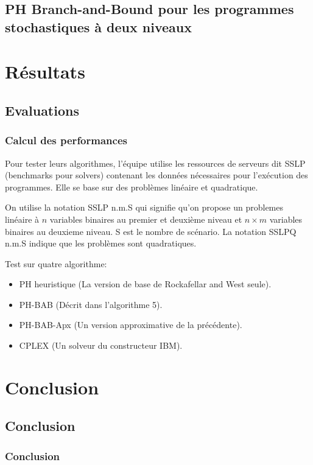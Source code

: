 \documentclass[10pt]{beamer}
\begin{document}
    \subsection{PH Branch-and-Bound pour les programmes stochastiques à deux niveaux}
    
    \section{Résultats}
    \subsection{Evaluations}
    \begin{frame}
        \frametitle{Calcul des performances}
        Pour tester leurs algorithmes, l'équipe utilise les ressources de serveurs dit SSLP (benchmarks pour solvers) contenant les données nécessaires pour l'exécution des programmes. Elle se base sur des problèmes linéaire et quadratique.
        
        On utilise la notation SSLP n.m.S qui signifie qu'on propose un problemes linéaire à $n$ variables binaires au premier et deuxième niveau et $n \times m$ variables binaires au deuxieme niveau. S est le nombre de scénario.
        La notation SSLPQ n.m.S indique que les problèmes sont quadratiques.
    \end{frame}
    
    \begin{frame}
        Test sur quatre algorithme:\\
        \begin{itemize}
            \item PH heuristique (La version de base de Rockafellar and West seule).
            \item PH-BAB (Décrit dans l'algorithme 5).
            \item PH-BAB-Apx (Un version approximative de la précédente).
            \item CPLEX (Un solveur du constructeur IBM).
        \end{itemize}
    \end{frame}
    
    \begin{frame}

    \end{frame}
    
    \section{Conclusion}
    \subsection{Conclusion}
    \begin{frame}
        \frametitle{Conclusion}
        
    \end{frame}
    
    \iffalse
    \fi
\end{document}
